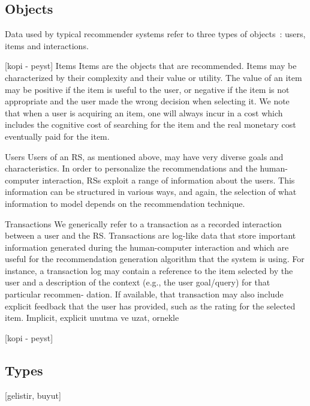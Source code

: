 \subsection{Objects}

Data used by typical recommender systems refer to three types of objects~\parencite{Ricci2015}: users, items and interactions. 

[kopi - peyst]
Items Items are the objects that are recommended. Items may be characterized by their complexity and their value or utility. The value of an item may be positive if the item is useful to the user, or negative if the item is not appropriate and the user made the wrong decision when selecting it. We note that when a user is acquiring an item, one will always incur in a cost which includes the cognitive cost of searching for the item and the real monetary cost eventually paid for the item.

Users Users of an RS, as mentioned above, may have very diverse goals and characteristics. In order to personalize the recommendations and the human- computer interaction, RSs exploit a range of information about the users. This information can be structured in various ways, and again, the selection of what information to model depends on the recommendation technique.

Transactions We generically refer to a transaction as a recorded interaction between a user and the RS. Transactions are log-like data that store important information generated during the human-computer interaction and which are useful for the recommendation generation algorithm that the system is using. For instance, a transaction log may contain a reference to the item selected by the user and a description of the context (e.g., the user goal/query) for that particular recommen- dation. If available, that transaction may also include explicit feedback that the user has provided, such as the rating for the selected item. Implicit, explicit unutma ve uzat, ornekle

[kopi - peyst]

\subsection{Types}

[gelistir, buyut]

